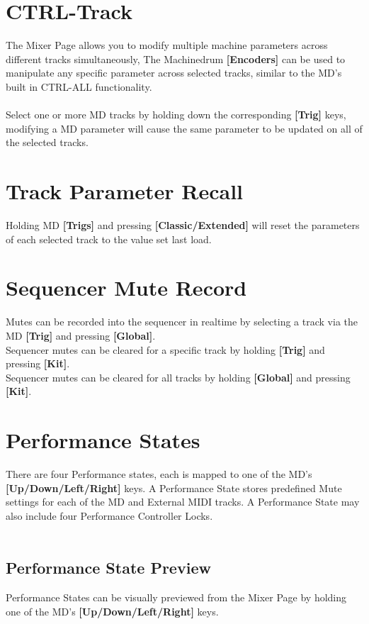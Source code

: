 \section{CTRL-Track}
The Mixer Page allows you to modify multiple machine parameters across different tracks simultaneously,
The Machinedrum \textbf{[Encoders]} can be used to manipulate any specific parameter across selected tracks, similar to the MD's built in CTRL-ALL functionality.\\\\
Select one or more MD tracks by holding down the corresponding  \textbf{[Trig]} keys, modifying a MD parameter will cause the same parameter to be updated on all of the selected tracks.
\section{Track Parameter Recall}
Holding MD \textbf{[Trigs]} and pressing \textbf{[Classic/Extended]} will reset the parameters of each selected track to the value set last load.
\section{Sequencer Mute Record}
Mutes can be recorded into the sequencer in realtime by selecting a track via the MD \textbf{[Trig]} and pressing \textbf{[Global]}.\\
Sequencer mutes can be cleared for a specific track by holding \textbf{[Trig]} and pressing \textbf{[Kit]}.\\
Sequencer mutes can be cleared for all tracks by holding \textbf{[Global]} and pressing \textbf{[Kit]}.
\newpage
\section{Performance States}
There are four Performance states, each is mapped to one of the MD's \textbf{[Up/Down/Left/Right]} keys.
A Performance State stores predefined Mute settings for each of the MD and External MIDI tracks. A Performance State may also include four Performance Controller Locks.\\\\
\subsection{Performance State Preview}
Performance States can be visually previewed from the Mixer Page by holding one of the MD's \textbf{[Up/Down/Left/Right]} keys. 
\\\\
